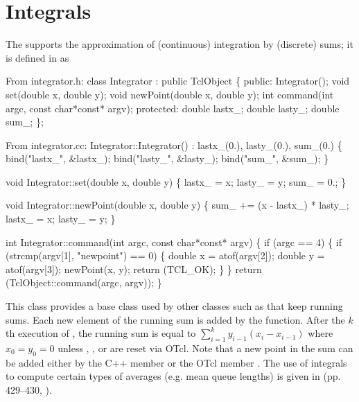 \section{Integrals}
\label{sec:integral}

The  
supports the approximation of (continuous) integration by (discrete)
sums; it is defined in  as
\begin{program}
{\rm From integrator.h:}
        class Integrator : public TclObject \{
        public:
                Integrator();
                void set(double x, double y);
                void newPoint(double x, double y);
                int command(int argc, const char*const* argv);
        protected:
                double lastx_;
                double lasty_;
                double sum_;
        \};

{\rm From integrator.cc:}
        Integrator::Integrator() : lastx_(0.), lasty_(0.), sum_(0.)
        \{
                bind("lastx_", &lastx_);
                bind("lasty_", &lasty_);
                bind("sum_", &sum_);
        \}

        void Integrator::set(double x, double y)
        \{
                lastx_ = x;
                lasty_ = y;
                sum_ = 0.;
        \}

        void Integrator::newPoint(double x, double y)
        \{
                sum_ += (x - lastx_) * lasty_;
                lastx_ = x;
                lasty_ = y;
        \}

        int Integrator::command(int argc, const char*const* argv)
        \{
                if (argc == 4) \{
                        if (strcmp(argv[1], "newpoint") == 0) \{
                                double x = atof(argv[2]);
                                double y = atof(argv[3]);
                                newPoint(x, y);
                                return (TCL_OK);
                        \}
                \}
                return (TclObject::command(argc, argv));
        \}
\end{program}
This class provides a base class used by other classes such
as  that keep running sums.
Each new element of the running sum is added by
the  function.
After the $k$th execution of , the running sum
is equal to $\sum_{i=1}^{k}y_{i-1}(x_i - x_{i-1})$ where
$x_0 = y_0 = 0$ unless , , or 
are reset via OTcl.
Note that a new point in the sum can be added either by the
C++ member  or the OTcl member .
The use of integrals to compute certain types of averages
(e.g. mean queue lengths) is given in (pp. 429--430, \cite{Jain91:Art}).

